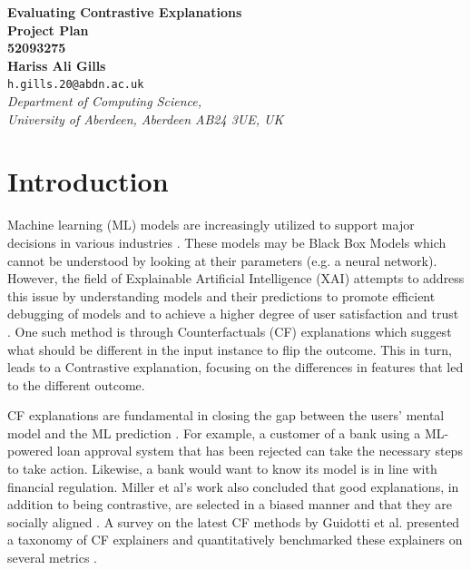 \documentclass[a4paper,12pt]{article}
\begin{document}
\begin{center}
{\Large\bf{Evaluating Contrastive Explanations}} \\
      \vspace{5.0mm}
{\Large\bf{Project Plan}} \\
      \vspace{8mm}
      {\large\bf{52093275}}  \\
      \vspace{5.0mm}
      \vspace{8mm}
      {\large\bf{Hariss Ali Gills}}  \\
      \vspace{5.0mm}
       {\tt h.gills.20@abdn.ac.uk} \\
      \vspace{5.0mm}
      {\em Department of Computing Science,\\
       University of Aberdeen, Aberdeen AB24 3UE, UK} 
\end{center}


\section*{Introduction}
Machine learning (ML) models are increasingly utilized to support major decisions in various industries \cite{angra2017machine}. These models may be Black Box Models which cannot be understood by looking at their parameters (e.g. a neural network). However, the field of Explainable Artificial Intelligence (XAI) attempts to address this issue by understanding models and their predictions to promote efficient debugging of models and to achieve a higher degree of user satisfaction and trust \cite{molnar2020interpretable}. One such method is through Counterfactuals (CF) explanations which suggest what should be different in the input instance to flip the outcome. This in turn, leads to a Contrastive explanation, focusing on the differences in features that led to the different outcome.

CF explanations are fundamental in closing the gap between the users' mental model and the ML prediction \cite{miller2019explanation}. For example, a customer of a bank using a ML-powered loan approval system that has been rejected can take the necessary steps to take action. Likewise, a bank would want to know its model is in line with financial regulation. Miller et al's work also concluded that good explanations, in addition to being contrastive, are selected in a biased manner and that they are socially aligned \cite{miller2019explanation}. A survey on the latest CF methods by Guidotti et al. presented a taxonomy of CF explainers and quantitatively benchmarked these explainers on several metrics \cite{guidotti2024counterfactual}.
\end{document}
